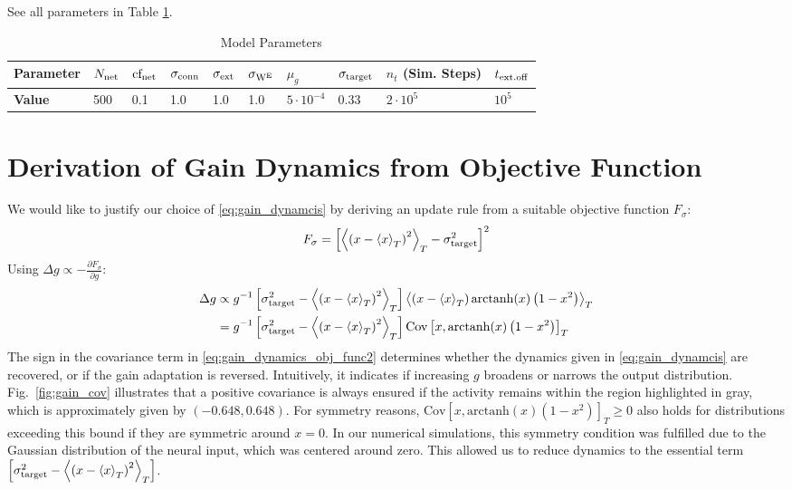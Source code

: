 \documentclass[10pt,a4paper]{article}
\newcommand{\avgt}[1]{\left< #1 \right>_T}
\begin{document}
See all parameters in Table \ref{tab:params}.

\begin{table}[h]
	\caption{Model Parameters}
	\centering
	\vspace{5pt}
	\begin{tabular}{ l | l | l | l | l | l | l | l | l | l}
		\textbf{Parameter} & $N_{\rm net}$ & ${\rm cf_{net}}$ & $\sigma_{\rm conn}$ & $\sigma_{\rm ext}$ & $\sigma_{\rm W^E}$ & $\mu_{g}$ & $\sigma_{\rm target}$ & $n_t$ (Sim. Steps) & $t_{\rm ext.off}$  \\
		\hline
		\rule{0pt}{12pt}
		\textbf{Value} & 500 & 0.1 & 1.0 & 1.0 & 1.0 & $5\cdot10^{-4}$ & 0.33 & $2\cdot 10^5$ & $10^5$
	\end{tabular}
	\label{tab:params}
\end{table}

\section{Derivation of Gain Dynamics from Objective Function}
We would like to justify our choice of \eqref{eq:gain_dynamcis} by deriving an update rule from a suitable objective function $F_{\sigma}$:
\begin{equation}
F_{\sigma} = \left[\avgt{\left(x-\avgt{x}\right)^2} - \sigma^2_{\rm target}\right]^2
\end{equation}
Using $\Delta g \propto - \frac{\partial F_\sigma}{\partial g}$:
\begin{align}
\Delta g &\propto g^{-1} \left[\sigma^2_{\rm target} - \avgt{\left(x-\avgt{x}\right)^2}\right]\avgt{\left(x-\avgt{x}\right)\mathrm{arctanh}(x)\left(1-x^2\right)} \label{eq:gain_dynamics_obj_func1} \\
&=g^{-1} \left[\sigma^2_{\rm target} - \avgt{\left(x-\avgt{x}\right)^2}\right]\mathrm{Cov}\left[ x,\mathrm{arctanh}(x)\left(1-x^2\right) \right]_T \label{eq:gain_dynamics_obj_func2}
\end{align}
The sign in the covariance term in \eqref{eq:gain_dynamics_obj_func2} determines whether the dynamics given in \eqref{eq:gain_dynamcis} are recovered, or if the gain adaptation is reversed. Intuitively, it indicates if increasing $g$ broadens or narrows the output distribution. Fig.~\ref{fig:gain_cov} illustrates that a positive covariance is always ensured if the activity remains within the region highlighted in gray, which is approximately given by $(-0.648,0.648)$. For symmetry reasons, $\mathrm{Cov}\left[ x,\mathrm{arctanh}(x)\left(1-x^2\right) \right]_T \geq 0$ also holds for distributions exceeding this bound if they are symmetric around $x=0$. In our numerical simulations, this symmetry condition was fulfilled due to the Gaussian distribution of the neural input, which was centered around zero. This allowed us to reduce dynamics to the essential term $\left[\sigma^2_{\rm target} - \avgt{\left(x-\avgt{x}\right)^2}\right]$.
\end{document}
